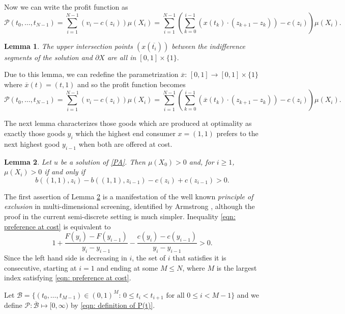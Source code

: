 \documentclass[12pt,reqno]{amsart}
\newtheorem{lem}{Lemma}
\begin{document}
Now we can write the profit function as
\[\mathcal{P}(t_0,\dots,t_{N-1})=\sum_{i=1}^{N-1}(v_i-c(z_i))\mu( X_i)=\sum_{i=1}^{N-1}(\sum_{k=0}^{i-1}(x(t_{k})\cdot (z_{k+1}-z_{k}))-c(z_i))\mu( X_i).\]
\begin{lem}\label{upper_segment}
The upper  intersection points    $(x(\overline{t_i}))$ between the indifference segments of the solution and $\partial X$  are all in $[0,1]\times\{1\}.$ 
\end{lem}




Due to this lemma, we can redefine the parametrization $\overline{x}:\,[0,1]\to [0,1]\times\{1\}$ where $\overline{x}(t)=(t,1)$ and so the profit function becomes 
\begin{equation}\label{eqn: definition of P(t)}
    \mathcal{P}(t_0,\dots,t_{N-1})=\sum_{i=1}^{N-1}(v_i-c(z_i))\mu( X_i)=\sum_{i=1}^{N-1}(\sum_{k=0}^{i-1}(\overline{x}(t_{k})\cdot (z_{k+1}-z_{k}))-c(z_i))\mu( X_i).
\end{equation}

The next lemma characterizes those goods which are produced at optimality as exactly those goods $y_i$ which the highest end consumer $x=(1,1)$ prefers to the next highest good $y_{i-1}$ when both are offered at cost.
\begin{lem}\label{m} 
Let $u$ be a solution of \eqref{PA}.  Then $\mu(X_0)>0$ and, for $i \geq 1$, $\mu(X_i) >0$ if and only if 
\begin{equation}\label{eqn: preference at cost}
b((1,1),z_{i}) -b((1,1),z_{i-1}) -c(z_{i})+c(z_{i-1}) >0.
\end{equation}

\end{lem}
The first assertion of Lemma \ref{m} is a manifestation of the well known \emph{principle of exclusion} in multi-dimensional screening, identified by Armstrong \cite{Armstrong96}, although the proof in the current semi-discrete setting is much simpler.
Inequality \eqref{eqn: preference at cost} is equivalent to
$$
1+\frac{F(y_{i}) -F(y_{i-1}) }{y_i-y_{i-1}}-\frac{c(y_{i}) -c(y_{i-1}) }{y_i-y_{i-1}}>0.
$$
Since the left hand side is decreasing in $i$, the set of $i$ that satisfies it is consecutive, starting at $i=1$ and ending at some $M \leq N$, where $M$ is the largest index satisfying \eqref{eqn: preference at cost}.



Let $\mathcal{B}=\{(t_0,\dots,t_{M-1})\in (0,1)^M:\, 0\le t_i<t_{i+1} \text{ for all } 0\le i<M-1\}$ and we define $\mathcal{P}:\overline{\mathcal{B}}\mapsto [0,\infty)$ by \eqref{eqn: definition of P(t)}.
\end{document}
